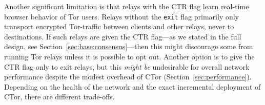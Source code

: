Another significant limitation is that relays with the CTR flag learn real-time
browser behavior of Tor users. Relays without the \texttt{exit} flag primarily
only transport encrypted Tor-traffic between clients and other relays, never to
destinations. If such relays are given the CTR flag---as we stated in the full
design, see Section~\ref{sec:base:consensus}---then this might discourage some
from running Tor relays unless it is possible to opt out. Another option is to
give the CTR flag only to exit relays, but this \emph{might be} undesirable for
overall network performance despite the modest overhead of CTor
(Section~\ref{sec:performance}). Depending on the health of the network and the
exact incremental deployment of CTor, there are different trade-offs.
